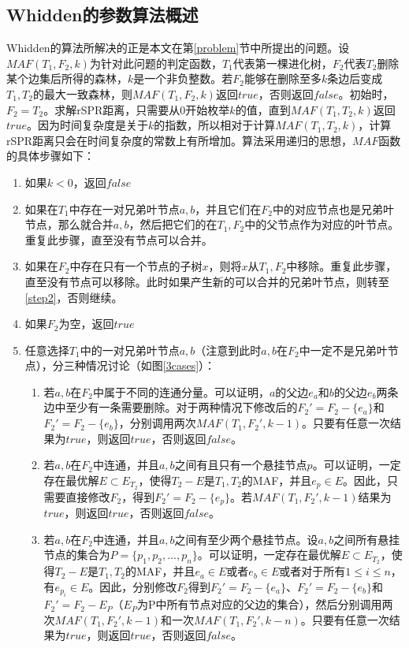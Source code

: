 \subsection{Whidden的参数算法概述}

Whidden的算法所解决的正是本文在第\ref{problem}节中所提出的问题。设$MAF(T_1,F_2,k)$为针对此问题的判定函数，$T_1$代表第一棵进化树，$F_2$代表$T_2$删除某个边集后所得的森林，$k$是一个非负整数。若$F_2$能够在删除至多$k$条边后变成$T_1,T_2$的最大一致森林，则$MAF(T_1,F_2,k)$返回$true$，否则返回$false$。初始时，$F_2 = T_2$。求解rSPR距离，只需要从$0$开始枚举$k$的值，直到$MAF(T_1,T_2,k)$返回$true$。因为时间复杂度是关于$k$的指数，所以相对于计算$MAF(T_1,T_2,k)$，计算rSPR距离只会在时间复杂度的常数上有所增加。算法采用递归的思想，$MAF$函数的具体步骤如下：

\begin{enumerate}
	\item 如果$k<0$，返回$false$
	\item \label{step2}如果在$T_1$中存在一对兄弟叶节点$a,b$，并且它们在$F_2$中的对应节点也是兄弟叶节点，那么就合并$a,b$，然后把它们的在$T_1,F_2$中的父节点作为对应的叶节点。重复此步骤，直至没有节点可以合并。
	\item 如果在$F_2$中存在只有一个节点的子树$x$，则将$x$从$T_1,F_2$中移除。重复此步骤，直至没有节点可以移除。此时如果产生新的可以合并的兄弟叶节点，则转至\ref{step2}，否则继续。
	\item 如果$F_2$为空，返回$true$
	\item \label{step5}任意选择$T_1$中的一对兄弟叶节点$a,b$（注意到此时$a,b$在$F_2$中一定不是兄弟叶节点），分三种情况讨论（如图\ref{3cases}）：
	\begin{enumerate}
		\item \label{case1}若$a,b$在$F_2$中属于不同的连通分量。可以证明，$a$的父边$e_a$和$b$的父边$e_b$两条边中至少有一条需要删除。对于两种情况下修改后的$F_2' = F_2 - \{e_a\}$和$F_2' = F_2 - \{e_b\}$，分别调用两次$MAF(T_1,F_2',k-1)$。只要有任意一次结果为$true$，则返回$true$，否则返回$false$。
		\item \label{case2}若$a,b$在$F_2$中连通，并且$a,b$之间有且只有一个悬挂节点$p$。可以证明，一定存在最优解$E \subset E_{T_2}$，使得$T_2 - E$是$T_1,T_2$的MAF，并且$e_p \in E$。因此，只需要直接修改$F_2$，得到$F_2' = F_2-\{e_p\}$。若$MAF(T_1,F_2',k-1)$结果为$true$，则返回$true$，否则返回$false$。
		\item \label{case3}若$a,b$在$F_2$中连通，并且$a,b$之间有至少两个悬挂节点。设$a,b$之间所有悬挂节点的集合为$P=\{p_1,p_2,...,p_n\}$。可以证明，一定存在最优解$E \subset E_{T_2}$，使得$T_2 - E$是$T_1,T_2$的MAF，并且$e_a \in E$或者$e_b \in E$或者对于所有$1 \le i \le n$，有$e_{p_i} \in E$。因此，分别修改$F_2$得到$F_2' = F_2 - \{e_a\}$、$F_2' = F_2 - \{e_b\}$和$F_2' = F_2 - E_P$（$E_P$为P中所有节点对应的父边的集合），然后分别调用两次$MAF(T_1,F_2',k-1)$和一次$MAF(T_1,F_2',k-n)$。只要有任意一次结果为$true$，则返回$true$，否则返回$false$。
	\end{enumerate}  
\end{enumerate}


